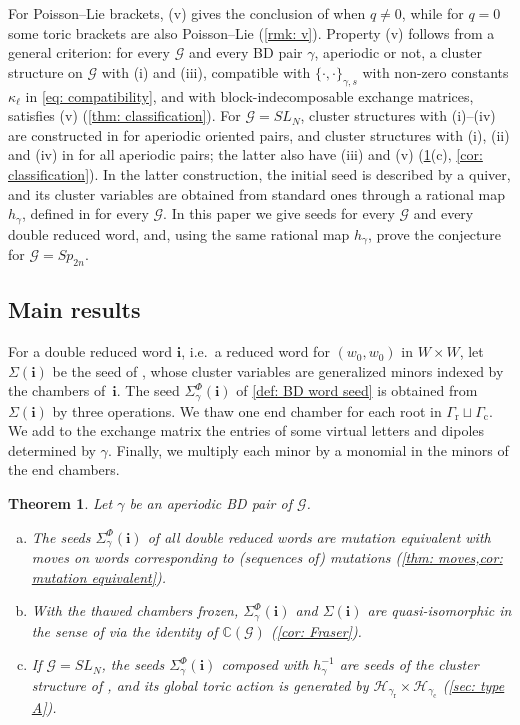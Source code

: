 \documentclass[a4paper]{amsart}
\numberwithin{equation}{section}
\newtheorem{theorem}{Theorem}[section]
\theoremstyle{definition}
\theoremstyle{remark}
\newcommand{\bbC}{\mathbb{C}}
\newcommand{\mcG}{\mathcal{G}}
\newcommand{\mcH}{\mathcal{H}}
\newcommand{\bfi}{\mathbf{i}}
\newcommand{\rr}{\mathrm{r}}
\newcommand{\cc}{\mathrm{c}}
\begin{document}
For Poisson--Lie brackets, (v) gives the conclusion of \cite[Conjecture~3.2(v)]{GSV11} when $q\neq0$, while for $q=0$ some toric brackets are also Poisson--Lie (\cref{rmk: v}).
Property (v) follows from a general criterion: for every $\mcG$ and every BD pair $\gamma$, aperiodic or not, a cluster structure on $\mcG$ with (i) and (iii), compatible with $\{\cdot,\cdot\}_{\gamma,s}$ with non-zero constants $\kappa_\ell$ in \eqref{eq: compatibility}, and with block-indecomposable exchange matrices, satisfies (v) (\cref{thm: classification}).
For $\mcG=SL_N$, cluster structures with (i)--(iv) are constructed in \cite[Theorem~3.3]{GSV19} for aperiodic oriented pairs, and cluster structures with (i), (ii) and (iv) in \cite{GSV23} for all aperiodic pairs; the latter also have (iii) and (v) (\cref{thm: A}(c), \cref{cor: classification}).
In the latter construction, the initial seed is described by a quiver, and its cluster variables are obtained from standard ones through a rational map $h_\gamma$, defined in \cite{GSV23} for every $\mcG$.
In this paper we give seeds for every $\mcG$ and every double reduced word, and, using the same rational map $h_\gamma$, prove the conjecture for $\mcG=Sp_{2n}$.

\subsection*{Main results}
For a double reduced word $\bfi$, i.e.\ a reduced word for $(w_0,w_0)$ in $W\times W$, let $\Sigma(\bfi)$ be the seed of \cite[Theorem~2.10]{BFZ05}, whose cluster variables are generalized minors indexed by the chambers of~$\bfi$.
The seed $\Sigma^\Phi_\gamma(\bfi)$ of \cref{def: BD word seed} is obtained from $\Sigma(\bfi)$ by three operations.
We thaw one end chamber for each root in $\Gamma_{\rr}\sqcup\Gamma_{\cc}$.
We add to the exchange matrix the entries of some virtual letters and dipoles determined by $\gamma$.
Finally, we multiply each minor by a monomial in the minors of the end chambers.

\begin{theorem}
  \label{thm: A}
  Let $\gamma$ be an aperiodic BD pair of $\mcG$.
  \begin{enumerate}[(a)]
    \item The seeds $\Sigma^\Phi_\gamma(\bfi)$ of all double reduced words are mutation equivalent with moves on words corresponding to (sequences of) mutations (\cref{thm: moves,cor: mutation equivalent}).
    \item With the thawed chambers frozen, $\Sigma^\Phi_\gamma(\bfi)$ and $\Sigma(\bfi)$ are quasi-isomorphic in the sense of \cite{Fra16} via the identity of $\bbC(\mcG)$ (\cref{cor: Fraser}).
    \item If $\mcG=SL_N$, the seeds $\Sigma^\Phi_\gamma(\bfi)$ composed with $h_\gamma^{-1}$ are seeds of the cluster structure of \cite{GSV23}, and its global toric action is generated by $\mcH_{\gamma_{\rr}}\times\mcH_{\gamma_{\cc}}$ (\cref{sec: type A}).
  \end{enumerate}
\end{theorem}
\end{document}
